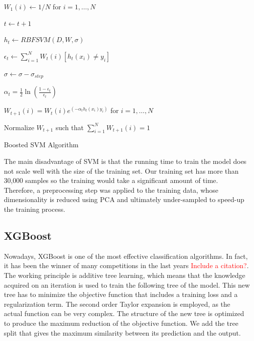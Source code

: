 \documentclass[conference]{IEEEtran}
\begin{document}
\begin{algorithm}

  $W_1(i) \leftarrow 1/N$ for $i=1,\dots,N$ %

    {
        $t \leftarrow t+1$

        $h_t \leftarrow RBFSVM(D,W,\sigma)$ 

        $\epsilon_t \leftarrow \sum^N_{i=1}W_t(i)[h_t(x_i)\neq y_i]$

        		{
		
		$\sigma \leftarrow \sigma - \sigma_{step}$
		
		}
	\Else
	{
	$\alpha_t = \frac{1}{2}\ln \left( \frac{1-\epsilon_t}{\epsilon_t} \right)$
	
	
	 $W_{t+1}(i) = W_t(i) e^{(-\alpha_th_t(x_i)y_i)}$ for $i=1,\dots,N$
	
	 Normalize $W_{t+1}$ such that $\sum^N_{i=1}W_{t+1}(i)=1$
	 }
    }
\caption{Boosted SVM Algorithm}
\end{algorithm}

The main disadvantage of SVM is that the running time to train the model does not scale well with the size of the training set\cite{boosting_svm}. Our training set has more than 30,000 samples so the training would take a significant amount of time. Therefore, a preprocessing step was applied to the training data, whose dimensionality is reduced using PCA and ultimately under-sampled to speed-up the training process.

\subsection{XGBoost}
Nowadays, XGBoost is one of the most effective classification algorithms. In fact, it has been the winner of many competitions in the last years \textcolor{red}{ Include a citation?}. The working principle is additive tree learning, which means that the knowledge acquired on an iteration is used to train the following tree of the model. This new tree has to minimize the objective function that includes a training loss and a regularization term. The second order Taylor expansion is employed, as the actual function can be very complex. The structure of the new tree is optimized to produce the maximum reduction of the objective function. We add the tree split that gives the maximum similarity between its prediction and the output.
\end{document}
